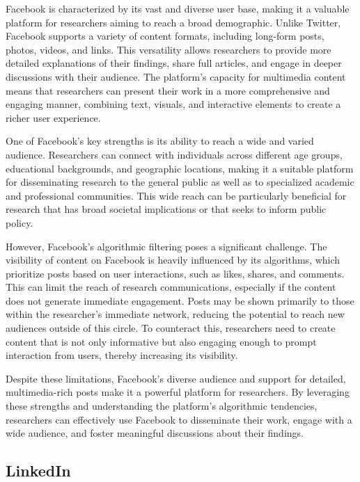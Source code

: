 \documentclass[
]{book}
\begin{document}
Facebook is characterized by its vast and diverse user base, making it a valuable platform for researchers aiming to reach a broad demographic. Unlike Twitter, Facebook supports a variety of content formats, including long-form posts, photos, videos, and links. This versatility allows researchers to provide more detailed explanations of their findings, share full articles, and engage in deeper discussions with their audience. The platform's capacity for multimedia content means that researchers can present their work in a more comprehensive and engaging manner, combining text, visuals, and interactive elements to create a richer user experience.

One of Facebook's key strengths is its ability to reach a wide and varied audience. Researchers can connect with individuals across different age groups, educational backgrounds, and geographic locations, making it a suitable platform for disseminating research to the general public as well as to specialized academic and professional communities. This wide reach can be particularly beneficial for research that has broad societal implications or that seeks to inform public policy.

However, Facebook's algorithmic filtering poses a significant challenge. The visibility of content on Facebook is heavily influenced by its algorithms, which prioritize posts based on user interactions, such as likes, shares, and comments. This can limit the reach of research communications, especially if the content does not generate immediate engagement. Posts may be shown primarily to those within the researcher's immediate network, reducing the potential to reach new audiences outside of this circle. To counteract this, researchers need to create content that is not only informative but also engaging enough to prompt interaction from users, thereby increasing its visibility.

Despite these limitations, Facebook's diverse audience and support for detailed, multimedia-rich posts make it a powerful platform for researchers. By leveraging these strengths and understanding the platform's algorithmic tendencies, researchers can effectively use Facebook to disseminate their work, engage with a wide audience, and foster meaningful discussions about their findings.

\subsection*{LinkedIn}\label{linkedin}
\end{document}
